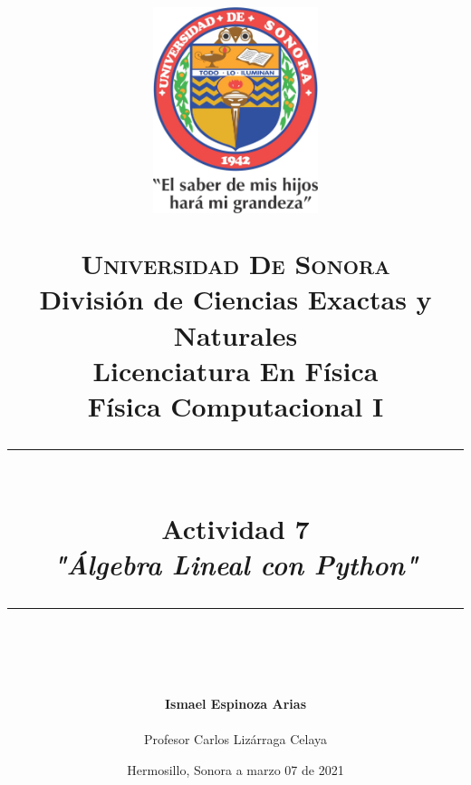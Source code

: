 \documentclass[12pt]{article}
\newcommand{\HRule}[1]{\rule{\linewidth}{#1}}
\begin{document}
\begin{titlepage}

\title{ \normalsize 
        \begin{center}
        \includegraphics[height=6cm]{Logo.jpg}
        \end{center}
        \LARGE \textsc{\textbf{Universidad De Sonora}} \\ \bigskip
		\Large División de Ciencias Exactas y Naturales \\
        Licenciatura En Física \\ \bigskip
        \bigskip
        Física Computacional I
		\\ [0.1cm]  
		\HRule{2pt} \\
		\Large \textbf{{Actividad 7}} \\
        \textit{\textbf{"Álgebra Lineal con Python"}}
		\HRule{2pt} \\
		\normalsize \vspace*{0.001\baselineskip}}
        
\date{\bigskip \Large  \hspace*{\fill} Hermosillo, Sonora a marzo 07 de 2021}

        
\author{
		\Large\textbf{ Ismael Espinoza Arias} \\ \bigskip
        \\ \bigskip
       \Large Profesor Carlos Lizárraga Celaya}
       \end{titlepage}
       \maketitle
       


\newpage
\pagestyle{plain}
\end{document}

